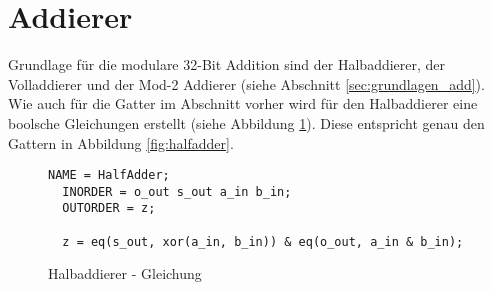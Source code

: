 \section{Addierer}
\label{sec:knf:addierer}

Grundlage für die modulare 32-Bit Addition sind der Halbaddierer, der Volladdierer und der Mod-2 Addierer (siehe Abschnitt \ref{sec:grundlagen_add}).
Wie auch für die Gatter im Abschnitt vorher wird für den Halbaddierer eine boolsche Gleichungen erstellt (siehe Abbildung \ref{fig:halfadder_eqn}).
Diese entspricht genau den Gattern in Abbildung \ref{fig:halfadder}.
\begin{figure}[!h]
  \centering
  \begin{lstlisting}[]
  NAME = HalfAdder;
  INORDER = o_out s_out a_in b_in;
  OUTORDER = z;

  z = eq(s_out, xor(a_in, b_in)) & eq(o_out, a_in & b_in);
  \end{lstlisting}
  \caption{Halbaddierer - Gleichung}
  \label{fig:halfadder_eqn}
\end{figure}

